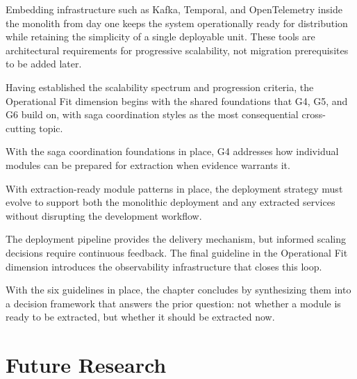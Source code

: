 Embedding infrastructure such as Kafka, Temporal, and OpenTelemetry inside the monolith from day one keeps the system operationally ready for distribution while retaining the simplicity of a single deployable unit. These tools are architectural requirements for progressive scalability, not migration prerequisites to be added later.






\noindent
Having established the scalability spectrum and progression criteria, the Operational Fit dimension begins with the shared foundations that G4, G5, and G6 build on, with saga coordination styles as the most consequential cross-cutting topic.



\noindent
With the saga coordination foundations in place, G4 addresses how individual modules can be prepared for extraction when evidence warrants it.



\noindent
With extraction-ready module patterns in place, the deployment strategy must evolve to support both the monolithic deployment and any extracted services without disrupting the development workflow.



\noindent
The deployment pipeline provides the delivery mechanism, but informed scaling decisions require continuous feedback. The final guideline in the Operational Fit dimension introduces the observability infrastructure that closes this loop.



With the six guidelines in place, the chapter concludes by synthesizing them into a decision framework that answers the prior question: not whether a module is ready to be extracted, but whether it should be extracted now.



\pagebreak
\section{Future Research}
\label{sec:future-guidelines}

